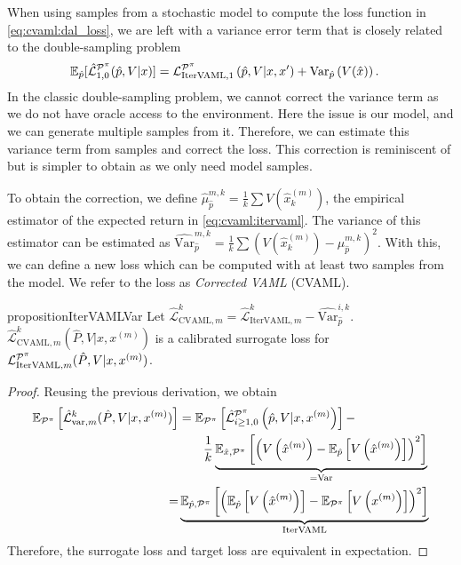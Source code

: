 When using samples from a stochastic model to compute the loss function in \autoref{eq:cvaml:dal_loss}, we are left with a variance error term that is closely related to the double-sampling problem
\begin{align}
 &\mathbb{E}_{\hat{p}}[\hat{\mathcal{L}}^{\P^\pi}_{1,0}(\hat{p},V|x)] = {\mathcal{L}}^{\P^\pi}_{\mathrm{IterVAML}, 1}\left(\hat{p},V|x,x'\right) + \mathrm{Var}_{\hat{p}}\left(V(\hat{x})\right).
\end{align}
In the classic double-sampling problem, we cannot correct the variance term as we do not have oracle access to the environment.
Here the issue is our model, and we can generate multiple samples from it.
Therefore, we can estimate this variance term from samples and correct the loss.
This correction is reminiscent of \textcite{antos2008learning} but is simpler to obtain as we only need model samples.

To obtain the correction, we define $\hat{\mu}_{\hat{p}}^{m,k} = \frac{1}{k}\sum V(\hat{x}_k^{(m)})$, the empirical estimator of the expected return in \autoref{eq:cvaml:itervaml}.
The variance of this estimator can be estimated as $\widehat{\mathrm{Var}}_{\hat{p}}^{m,k} = \frac{1}{k} \sum (V(\hat{x}_k^{(m)}) - \mu_{\hat{p}}^{m,k})^2$.
With this, we can define a new loss which can be computed with at least two samples from the model.
We refer to the loss as \emph{Corrected VAML} (CVAML).

\begin{restatable}{proposition}{IterVAMLVar}\label{prop:cvaml:2_2}
    Let $\hat{\mathcal{L}}_{\mathrm{CVAML}, m}^{k} = \hat{\mathcal{L}}^k_{\mathrm{IterVAML}, m} - \widehat{\mathrm{Var}}_{\hat{p}}^{i,k}.$
    $\hat{\mathcal{L}}_{\mathrm{CVAML}, m}^{k}(\hat{P}, V|x, x^{(m)})$ is a calibrated surrogate loss for $\mathcal{L}_{\mathrm{IterVAML}, m}^{\P^\pi}(\hat{P}, V|x, x^{(m)})$.
\end{restatable}
\begin{proof}
Reusing the previous derivation, we obtain
\begin{align}
    \EEX{\P^\pi}{\hat{\mathcal{L}}_{\mathrm{var}, m}^{k}(\hat{P}, V|x, x^{(m)})} &= \EEX{\P^\pi}{\hat{\mathcal{L}}^{\P^\pi}_{i\geq1,0}\left(\hat{p},V|x,x^{(m)}\right)} - \\ &\quad\quad \frac{1}{k}\underbrace{\EEX{\hat{x},\P^\pi}{\left(V\left(\hat{x}^{(m)}\right) - \EEX{\hat{p}}{V\left(\hat{x}^{(m)}\right)}\right)^2}}_{= \mathrm{Var}}\\
    = & \underbrace{\EEX{\hat{p},\P^\pi}{\left(\EEX{\hat{p}}{V\left(\hat{x}^{(m)}\right)} - \EEX{\P^\pi}{V\left(x^{(m)}\right)}\right)^2}}_{\mathrm{IterVAML}}
\end{align}
Therefore, the surrogate loss and target loss are equivalent in expectation.
\end{proof}


